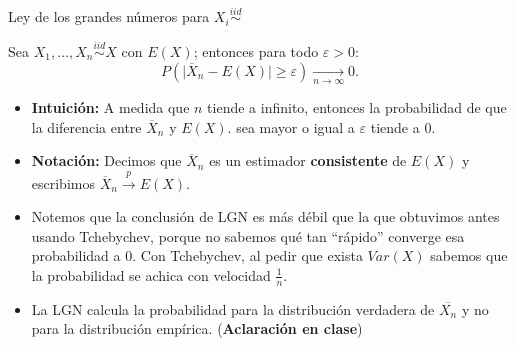 \documentclass{beamer}
\theoremstyle{definition}
\newcommand{\eps}{\varepsilon}
\begin{document}
\begin{frame}{\color{rosee}Ley de los grandes n\'umeros para $X_i\stackrel{iid}{\sim}$}\small
  
    Sea $X_{1},\dots,X_{n}\stackrel{iid}{\sim} X$ con $E(X)$; entonces para todo $\varepsilon>0$:
    \begin{equation*}
     P\left( \vert \overline{X}_{n}-E(X) \vert \geq
      \varepsilon\right)\underset{n\to\infty}{\to} 0.
    \end{equation*}
\begin{itemize}
    \item  \textbf{Intuición:} A medida que $n$ tiende a infinito, entonces la  probabilidad de que la diferencia entre $\overline{X}_n$ y $E(X)$. sea mayor o igual a $\eps$ tiende a $0$. %

  \item \textbf{Notación: }Decimos que $\overline{X}_n$ es un estimador \textbf{consistente} de $E(X)$ y escribimos $\overline{X}_n \stackrel{p}{\to} E(X)$.

    
  \item Notemos que la conclusi\'on de LGN es m\'as d\'ebil que la que obtuvimos antes usando Tchebychev, porque no sabemos qué tan ``rápido'' converge esa probabilidad a $0$. Con Tchebychev, al pedir que exista $Var(X)$ sabemos que la probabilidad se achica con velocidad $\frac{1}{n}$.
  \item La LGN calcula la probabilidad para la distribución verdadera de $\overline{X_n}$ y no para la distribución empírica. (\textbf{Aclaración en clase})
  \end{itemize}
\end{frame}
\end{document}

